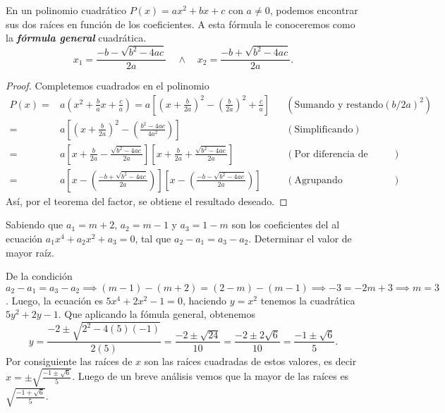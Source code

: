 En un polinomio cuadrático $P(x) = ax^2 + bx + c$ con $a \neq 0$, podemos encontrar sus dos raíces en función de los coeficientes.
A esta fórmula le conoceremos como la \textbf{\emph{fórmula general}} cuadrática.
\[
    x_1 = \frac{-b - \sqrt {b^2 - 4ac}}{2a}\quad\land\quad x_2 = \frac{-b + \sqrt {b^2 - 4ac}}{2a}.
\]
\begin{proof}
    Completemos cuadrados en el polinomio
    \begin{align*}
        P(x) =& a \left( x^2 + \frac{b}{a}x + \frac{c}{a} \right) = a \left[ \left( x + \frac{b}{2a} \right)^2 - \left( \frac{b}{2a} \right)^2 + \frac{c}{a} \right] && (\text{Sumando y restando} \left( b/2a \right)^2)\\
        =& a \left[ \left( x + \frac{b}{2a} \right)^2 - \left( \frac{b^2 - 4ac}{4a^2}\right) \right]  && (\text{Simplificando})\\
        =& a \left[ x + \frac{b}{2a} - \frac{\sqrt {b^2 - 4ac}}{2a}\right]\left[ x + \frac{b}{2a} + \frac{\sqrt {b^2 - 4ac}}{2a}\right]  && (\text{Por diferencia de cuadrados})\\
        =& a \left[ x - \left( \frac{-b + \sqrt {b^2 - 4ac}}{2a} \right) \right]\left[ x - \left( \frac{-b - \sqrt {b^2 - 4ac}}{2a} \right) \right] && (\text{Agrupando coeficientes})
    \end{align*}
    Así, por el teorema del factor, se obtiene el resultado deseado.
\end{proof}

\begin{example}
    Sabiendo que $a_1 = m + 2$, $a_2 = m - 1$ y $a_3 = 1 - m$ son los coeficientes del al ecuación $a_1 x^4 + a_2 x^2 + a_3 = 0$, tal que $a_2 - a_1 = a_3 - a_2$.
    Determinar el valor de mayor raíz.
\end{example}
\begin{solution}
    De la condición $a_2 - a_1 = a_3 - a_2 \implies (m - 1) - (m + 2) = (2 - m) - (m - 1) \implies -3 = -2m + 3 \implies m = 3$.
    Luego, la ecuación es $5x^4 + 2x^2 - 1 = 0$, haciendo $y = x^2$ tenemos la cuadrática $5y^2 + 2y - 1$.
    Que aplicando la fómula general, obtenemos
    \[
        y = \frac{-2 \pm \sqrt{2^2 - 4(5)(-1)}}{2(5)} = \frac{-2 \pm \sqrt{24}}{10} = \frac{-2 \pm 2\sqrt{6}}{10} = \frac{-1 \pm \sqrt{6}}{5}.
    \]
    Por consiguiente las raíces de $x$ son las raíces cuadradas de estos valores, es decir $x = \pm \sqrt {\frac{-1 \pm \sqrt{6}}{5}}$.
    Luego de un breve análisis vemos que la mayor de las raíces es $\sqrt {\frac{-1 + \sqrt{6}}{5}}$.
\end{solution}

